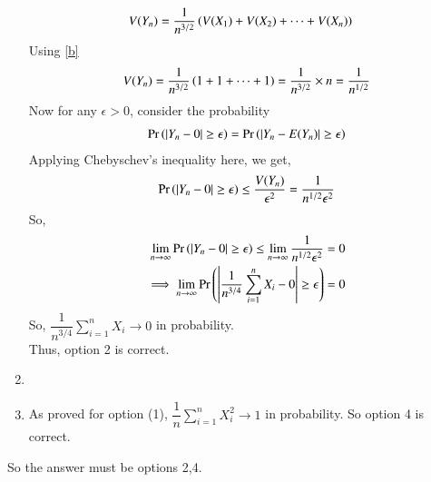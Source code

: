 \documentclass[journal,12pt,twocolumn]{IEEEtran}
\begin{document}
\begin{enumerate}
\begin{align}
            V(Y_n) &= \dfrac{1}{n^{3/2}}\left(V(X_1)+V(X_2)+ \dots +V(X_n)\right)
        \end{align}
        Using \eqref{b}
        \begin{align}
            V(Y_n)=\dfrac{1}{n^{3/2}}\left(1+1+ \dots +1\right)=\dfrac{1}{n^{3/2}}\times n=\dfrac{1}{n^{1/2}}
        \end{align}
        Now for any $\epsilon>0$, consider the probability
        \begin{align}
            \Pr\left(|Y_n-0|\geq \epsilon\right)=\Pr\left(|Y_n-E(Y_n)|\geq \epsilon\right)
        \end{align}
        Applying Chebyschev's inequality here, we get,
        \begin{align}
            \Pr\left(|Y_n-0|\geq \epsilon\right) \leq \dfrac{V(Y_n)}{\epsilon^2} = \dfrac{1}{n^{1/2}\epsilon^2}
        \end{align}
        So,
        \begin{align}
            \lim_{n \to \infty}\Pr\left(|Y_n-0|\geq \epsilon\right) \leq \lim_{n \to \infty }\dfrac{1}{n^{1/2}\epsilon^2}=0\\
            \implies \lim_{n \to \infty}\Pr\left(\left | \dfrac{1}{n^{3/4}}\sum_{i=1}^nX_i - 0 \right|\geq \epsilon\right)=0
        \end{align}
        So, $\dfrac{1}{n^{3/4}}\sum_{i=1}^nX_i \to 0$ in probability.\\
        Thus, option 2 is correct.
    \item
    \item
        As proved for option (1), $\dfrac{1}{n}\sum_{i=1}^nX_i^2 \to 1$ in probability.
        So option 4 is correct.
\end{enumerate}
So the answer must be options 2,4.
\end{document}
